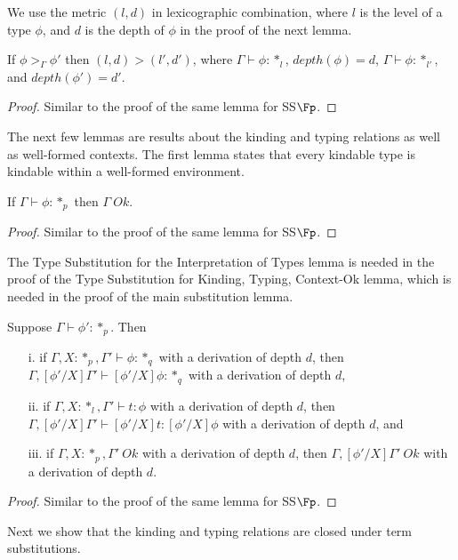 \noindent
We use the metric $(l,d)$ in lexicographic combination, where $l$ is the level of
a type $\phi$, and $d$ is the depth of $\phi$ in the proof of the next lemma.  

\begin{lemma}
  \label{lemma:well-founded_measure_ssfe}
  If $\phi >_\Gamma \phi'$ then $(l,d) > (l',d')$, where $\Gamma \vdash \phi:*_l$, 
  $depth(\phi) = d$,  $\Gamma \vdash \phi:*_{l'}$, and $depth(\phi') = d'$.
\end{lemma}
\begin{proof}
  Similar to the proof of the same lemma for SS$\Fp$. 
\end{proof}
The next few lemmas are results about the kinding and typing relations as
well as well-formed contexts.  The first lemma states that every
kindable type is kindable within a well-formed environment.  

\begin{lemma}
  If $\Gamma \vdash \phi:*_p$ then $\Gamma\ Ok$.
  \label{lemma:kinding_ok_ssfe}
\end{lemma}
\begin{proof}
  Similar to the proof of the same lemma for SS$\Fp$.
\end{proof}
\noindent
The Type Substitution for the Interpretation of Types lemma is needed in the proof of
the Type Substitution for Kinding, Typing, Context-Ok lemma, which is needed in the proof
of the main substitution lemma.

\begin{lemma}
  Suppose $\Gamma \vdash \phi':*_p$.  Then
  \begin{itemize}
  \item[i.] if $\Gamma,X:*_p,\Gamma' \vdash \phi:*_q$ with a
    derivation of depth $d$, then $\Gamma,[\phi'/X]\Gamma' \vdash
    [\phi'/X]\phi:*_q$ with a derivation of depth $d$,
    
  \item[ii.] if $\Gamma, X:*_l,\Gamma' \vdash t:\phi$ with a
    derivation of depth $d$, then $\Gamma,[\phi'/X]\Gamma' \vdash
    [\phi'/X]t:[\phi'/X]\phi$ with a derivation of depth $d$, and
    
  \item[iii.] if $\Gamma,X:*_p,\Gamma'\ Ok$ with a derivation of depth $d$, then 
    $\Gamma,[\phi'/X]\Gamma'\ Ok$ with a derivation of depth $d$.
  \end{itemize}
  \label{lemma:substitution_for_kinding_ssfe}
\end{lemma}
\begin{proof}
  Similar to the proof of the same lemma for SS$\Fp$.
\end{proof}
\noindent
Next we show that the kinding and typing relations are
closed under term substitutions.

